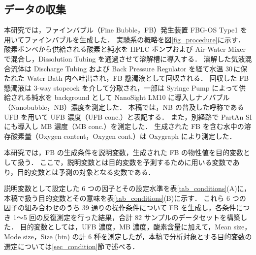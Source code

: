 \subsection{データの収集}
\label{sec_data_collection}

本研究では，ファインバブル（Fine Bubble，FB）発生装置 FBG-OS Type1 を用いてファインバブルを生成した．
実験系の概略を図\ref{fig_procedure}に示す．
酸素ボンベから供給される酸素と純水を HPLC ポンプおよび Air-Water Mixer で混合し，Dissolution Tubing を通過させて溶解槽に導入する．
溶解した気液混合流体は Discharge Tubing および Back Pressure Regulator を経て水温 30\,\textcelsius に保たれた Water Bath 内へ吐出され，FB 懸濁液として回収される．
回収した FB 懸濁液は 3-way stopcock を介して分取され，一部は Syringe Pump によって供給される純水を background として NanoSight LM10 に導入しナノバブル（Nanobubble，NB）濃度を測定した．
本稿では，NB の普及した呼称である UFB を用いて UFB 濃度（UFB conc.）と表記する．
また，別経路で PartAn SI にも導入し MB 濃度（MB conc.）を測定した．
生成された FB を含む水中の溶存酸素量（Oxygen content，Oxygen cont.）は Oxygraph により測定した．

本研究では，FB の生成条件を説明変数，生成された FB の物性値を目的変数として扱う．
ここで，説明変数とは目的変数を予測するために用いる変数であり，目的変数とは予測の対象となる変数である．

説明変数として設定した 6 つの因子とその設定水準を表\ref{tab_conditions}(A)に，本稿で扱う目的変数とその意味を表\ref{tab_conditions}(B)に示す．
これら 6 つの因子の組み合わせのうち 39 通りの操作条件について FB を生成し，各条件につき 1〜5 回の反復測定を行った結果，合計 82 サンプルのデータセットを構築した．
目的変数としては，UFB 濃度，MB 濃度，酸素含量に加えて，Mean size，Mode size，Size (bin) の計 6 種を測定したが，本稿で分析対象とする目的変数の選定については\ref{sec_condition}節で述べる．

